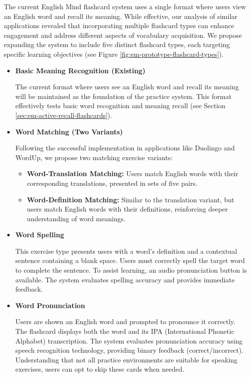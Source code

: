 The current English Mind flashcard system uses a single format where users view an English word and recall its meaning. While effective, our analysis of similar applications revealed that incorporating multiple flashcard types can enhance engagement and address different aspects of vocabulary acquisition. We propose expanding the system to include five distinct flashcard types, each targeting specific learning objectives (see Figure \ref{fig:em-prototype-flashcard-types}).

\begin{itemize}
    \item \textbf{Basic Meaning Recognition (Existing)}

    The current format where users see an English word and recall its meaning will be maintained as the foundation of the practice system. This format effectively tests basic word recognition and meaning recall (see Section \ref{sec:em-active-recall-flashcards}).

    \item \textbf{Word Matching (Two Variants)}
    
    Following the successful implementation in applications like Duolingo and WordUp, we propose two matching exercise variants:
    
    \begin{itemize}
        \item \textbf{Word-Translation Matching:} Users match English words with their corresponding translations, presented in sets of five pairs.
        
        \item \textbf{Word-Definition Matching:} Similar to the translation variant, but users match English words with their definitions, reinforcing deeper understanding of word meanings.
    \end{itemize}

    \item \textbf{Word Spelling}
    
    This exercise type presents users with a word's definition and a contextual sentence containing a blank space. Users must correctly spell the target word to complete the sentence. To assist learning, an audio pronunciation button is available. The system evaluates spelling accuracy and provides immediate feedback.
    \newpage

    \item \textbf{Word Pronunciation}

    Users are shown an English word and prompted to pronounce it correctly. The flashcard displays both the word and its IPA (International Phonetic Alphabet) transcription. The system evaluates pronunciation accuracy using speech recognition technology, providing binary feedback (correct/incorrect). Understanding that not all practice environments are suitable for speaking exercises, users can opt to skip these cards when needed.

\end{itemize}

